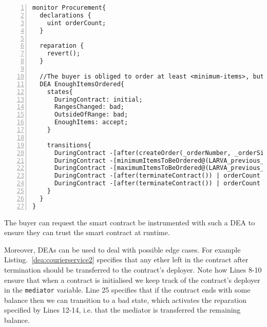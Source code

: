 \documentclass{article}
\newcommand{\tildearrow}{{\raise.37ex\hbox{$\scriptstyle\mathtt{\sim}$}}\hspace{-0.08cm}>\xspace}
\begin{document}
     \small\begin{lstlisting}[language=DEA,basicstyle=\scriptsize,numbers=left,numbersep=2pt,xleftmargin=0.3cm,escapechar=\%,label={dea:courierservice1}]
monitor Procurement{
  declarations {
    uint orderCount;
  }

  reparation {
    revert(); 
  }

  //The buyer is obliged to order at least <minimum-items>, but no more than <maximum-items> items for a fixed price <price> before the termination of this contract.
  DEA EnoughItemsOrdered{
    states{
      DuringContract: initial;
      RangesChanged: bad;
      OutsideOfRange: bad;
      EnoughItems: accept;
    }

    transitions{
      DuringContract -[after(createOrder(_orderNumber, _orderSize, _orderDeliveryTimeLeft)) | %$\tildearrow$% orderCount += _orderNumber;]-> DuringContract;
      DuringContract -[minimumItemsToBeOrdered@(LARVA_previous_minimumItemsToBeOrdered != minimumItemsToBeOrdered)]-> RangesChanged;
      DuringContract -[maximumItemsToBeOrdered@(LARVA_previous_minimumItemsToBeOrdered != minimumItemsToBeOrdered)]-> RangesChanged;
      DuringContract -[after(terminateContract()) | orderCount < minimumItemsToBeOrdered || orderCount > maximumItemsToBeOrdered]-> OutsideOfRange;
      DuringContract -[after(terminateContract()) | orderCount >= minimumItemsToBeOrdered && orderCount <= maximumItemsToBeOrdered]-> EnoughItems;
    }
  }
}
    \end{lstlisting}\normalsize
    
    The buyer can request the smart contract be instrumented with such a DEA to ensure they can trust the smart contract at runtime.
    
    Moreover, DEAs can be used to deal with possible edge cases. For example Listing.~\ref{dea:courierservice2} specifies that any ether left in the contract after termination should be transferred to the contract's deployer. Note how Lines 8-10 ensure that when a contract is initialised we keep track of the contract's deployer in the \texttt{mediator} variable. Line 25 specifies that if the contract ends with some balance then we can transition to a bad state, which activates the reparation specified by Lines 12-14, i.e. that the mediator is transferred the remaining balance.
    
\end{document}
